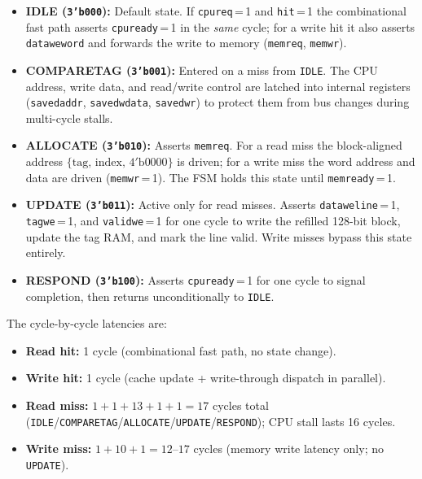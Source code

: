 \documentclass[conference]{IEEEtran}
\renewcommand{\_}{\textunderscore\allowbreak{}}
\begin{document}
\begin{itemize}
  \item \textbf{IDLE (\texttt{3'b000}):} Default state. If
        \texttt{cpu\_req}\,=\,1 and \texttt{hit}\,=\,1 the combinational
        fast path asserts \texttt{cpu\_ready}\,=\,1 in the \emph{same}
        cycle; for a write hit it also asserts \texttt{data\_we\_word}
        and forwards the write to memory (\texttt{mem\_req},
        \texttt{mem\_wr}).
  \item \textbf{COMPARE\_TAG (\texttt{3'b001}):} Entered on a miss from
        \texttt{IDLE}. The CPU address, write data, and
        read/write control are latched into internal registers
        (\texttt{saved\_addr}, \texttt{saved\_wdata},
        \texttt{saved\_wr}) to protect them from bus changes during
        multi-cycle stalls.
  \item \textbf{ALLOCATE (\texttt{3'b010}):} Asserts \texttt{mem\_req}.
        For a read miss the block-aligned address
        $\{\mathrm{tag},\,\mathrm{index},\,4'\mathrm{b}0000\}$ is
        driven; for a write miss the word address and data are driven
        (\texttt{mem\_wr}\,=\,1). The FSM holds this state until
        \texttt{mem\_ready}\,=\,1.
  \item \textbf{UPDATE (\texttt{3'b011}):} Active only for read misses.
        Asserts \texttt{data\_we\_line}\,=\,1,
        \texttt{tag\_we}\,=\,1, and \texttt{valid\_we}\,=\,1 for one
        cycle to write the refilled 128-bit block, update the tag RAM,
        and mark the line valid. Write misses bypass this state entirely.
  \item \textbf{RESPOND (\texttt{3'b100}):} Asserts
        \texttt{cpu\_ready}\,=\,1 for one cycle to signal completion,
        then returns unconditionally to \texttt{IDLE}.
\end{itemize}

The cycle-by-cycle latencies are:
\begin{itemize}
  \item \textbf{Read hit:} 1 cycle (combinational fast path, no state change).
  \item \textbf{Write hit:} 1 cycle (cache update + write-through dispatch in parallel).
  \item \textbf{Read miss:} $1 + 1 + 13 + 1 + 1 = 17$ cycles total
        (\texttt{IDLE}/\texttt{COMPARE\_TAG}/\texttt{ALLOCATE}/\texttt{UPDATE}/\texttt{RESPOND});
        CPU stall lasts 16 cycles.
  \item \textbf{Write miss:} $1 + 10 + 1 = 12$--$17$ cycles
        (memory write latency only; no \texttt{UPDATE}).
\end{itemize}
\end{document}
